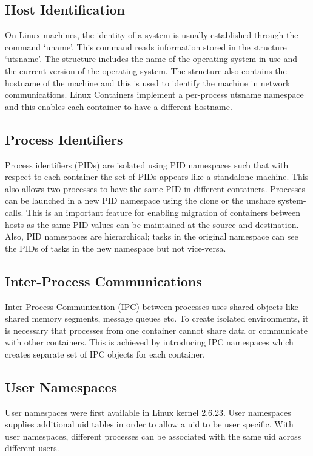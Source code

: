 \subsection{Host Identification}
On Linux machines, the identity of a system is usually established through the command `uname'. This command reads information stored in the structure `utsname'. The structure includes the name of the operating system in use and the current version of the operating system. The structure also contains the hostname of the machine and this is used to identify the machine in network communications. Linux Containers implement a per-process utsname namespace and this enables each container to have a different hostname.

\subsection{Process Identifiers}
Process identifiers (PIDs) are isolated using PID namespaces such that with respect to each container the set of PIDs appears like a standalone machine. This also allows two processes to  have the same PID in different containers. Processes can be launched in a new PID namespace using the clone or the unshare system-calls. This is an important feature for enabling migration of containers between hosts as the same PID values can be maintained at the source and destination. Also, PID namespaces are hierarchical; tasks in the original namespace can see the PIDs of tasks in the new namespace but not vice-versa.  

\subsection{Inter-Process Communications}
Inter-Process Communication (IPC) between processes uses shared objects like shared memory segments, message queues etc. To create isolated environments, it is necessary that processes from one container cannot share data or communicate with other containers. This is achieved by introducing IPC namespaces which creates separate set of IPC objects for each container.

\subsection{User Namespaces}
User namespaces were first available in Linux kernel 2.6.23.  User namespaces supplies additional uid tables in order to allow a uid to be user specific.  With user namespaces, different processes can be associated with the same uid across different users.

